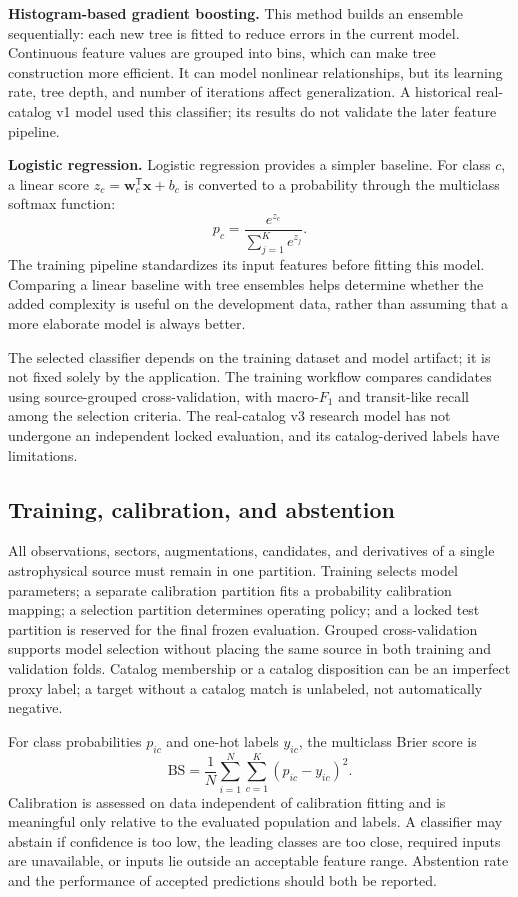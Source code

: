 \documentclass[11pt,a4paper]{article}
\begin{document}
\textbf{Histogram-based gradient boosting.} This method builds an ensemble sequentially: each new tree is fitted to reduce errors in the current model. Continuous feature values are grouped into bins, which can make tree construction more efficient. It can model nonlinear relationships, but its learning rate, tree depth, and number of iterations affect generalization. A historical real-catalog v1 model used this classifier; its results do not validate the later feature pipeline.

\textbf{Logistic regression.} Logistic regression provides a simpler baseline. For class $c$, a linear score $z_c=\boldsymbol{w}_c^{\mathsf T}\boldsymbol{x}+b_c$ is converted to a probability through the multiclass softmax function:
\begin{equation}
p_c=\frac{e^{z_c}}{\sum_{j=1}^{K}e^{z_j}}.
\end{equation}
The training pipeline standardizes its input features before fitting this model. Comparing a linear baseline with tree ensembles helps determine whether the added complexity is useful on the development data, rather than assuming that a more elaborate model is always better.

The selected classifier depends on the training dataset and model artifact; it is not fixed solely by the application. The training workflow compares candidates using source-grouped cross-validation, with macro-$F_1$ and transit-like recall among the selection criteria. The real-catalog v3 research model has not undergone an independent locked evaluation, and its catalog-derived labels have limitations.

\subsection{Training, calibration, and abstention}
All observations, sectors, augmentations, candidates, and derivatives of a single astrophysical source must remain in one partition. Training selects model parameters; a separate calibration partition fits a probability calibration mapping; a selection partition determines operating policy; and a locked test partition is reserved for the final frozen evaluation. Grouped cross-validation supports model selection without placing the same source in both training and validation folds. Catalog membership or a catalog disposition can be an imperfect proxy label; a target without a catalog match is unlabeled, not automatically negative.

For class probabilities $p_{ic}$ and one-hot labels $y_{ic}$, the multiclass Brier score is
\begin{equation}
\mathrm{BS}=\frac1N\sum_{i=1}^{N}\sum_{c=1}^{K}(p_{ic}-y_{ic})^2.
\end{equation}
Calibration is assessed on data independent of calibration fitting and is meaningful only relative to the evaluated population and labels. A classifier may abstain if confidence is too low, the leading classes are too close, required inputs are unavailable, or inputs lie outside an acceptable feature range. Abstention rate and the performance of accepted predictions should both be reported.
\end{document}
